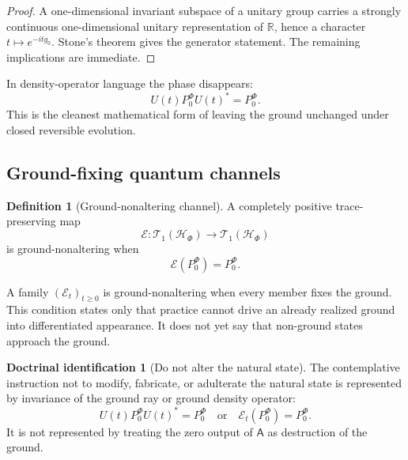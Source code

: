 \documentclass[11pt,reqno]{scrartcl}
\newcommand{\RR}{\mathbb R}
\newcommand{\scrHF}{\mathscr H_{\Phi}}
\newcommand{\PzeroF}{P_{0}^{\Phi}}
\newcommand{\Aodd}{\mathsf A}
\theoremstyle{plain}
\theoremstyle{definition}
\newtheorem{definition}[definition]{Definition}
\newtheorem{identification}[identification]{Doctrinal identification}
\theoremstyle{remark}
\begin{document}
\begin{proof}
A one-dimensional invariant subspace of a unitary group carries a strongly
continuous one-dimensional unitary representation of $\RR$, hence a character
$t\mapsto e^{-itg_0}$.  Stone's theorem gives the generator statement.  The
remaining implications are immediate.
\end{proof}

In density-operator language the phase disappears:
\begin{equation}
  U(t)\PzeroF U(t)^*=\PzeroF.
  \label{eq:density-ground-unitary-fixed}
\end{equation}
This is the cleanest mathematical form of leaving the ground unchanged under
closed reversible evolution.

\subsection{Ground-fixing quantum channels}

\begin{definition}[Ground-nonaltering channel]
\label{def:ground-nonaltering-channel}
A completely positive trace-preserving map
\begin{equation}
  \mathcal E:\mathcal T_1(\scrHF)\to\mathcal T_1(\scrHF)
\end{equation}
is ground-nonaltering when
\begin{equation}
  \boxed{\mathcal E(\PzeroF)=\PzeroF.}
  \label{eq:channel-ground-fixed}
\end{equation}
\end{definition}

A family $(\mathcal E_t)_{t\geq0}$ is ground-nonaltering when every member
fixes the ground.  This condition states only that practice cannot drive an
already realized ground into differentiated appearance.  It does not yet say
that non-ground states approach the ground.

\begin{identification}[Do not alter the natural state]
\label{id:nonalteration-doctrinal}
The contemplative instruction not to modify, fabricate, or adulterate the
natural state is represented by invariance of the ground ray or ground density
operator:
\begin{equation}
  U(t)\PzeroF U(t)^*=\PzeroF
  \quad\text{or}\quad
  \mathcal E_t(\PzeroF)=\PzeroF.
  \label{eq:nonalteration-summary}
\end{equation}
It is not represented by treating the zero output of $\Aodd$ as destruction
of the ground.
\end{identification}
\end{document}
